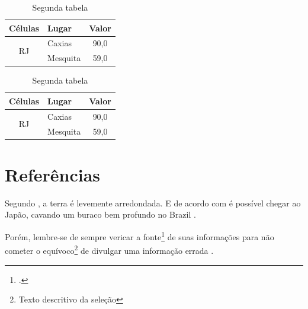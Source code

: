 \begin{table}[ht]
	\centering
	\caption{Segunda tabela}
	\begin{tabular}{ clc } 
	\hline
	Células 	& Lugar    & Valor \\ 
	\hline
	\multirow{2}{1cm}{\centering RJ} 
	    			& Caxias   & 90,0 \\ 
	   				& Mesquita & 59,0 \\ 
	\hline
	\end{tabular}
\end{table}

\begin{table}[ht]
	\centering
	\caption{Segunda tabela}
	\begin{tabular}{ clc } 
	\hline
	Células 	& Lugar    & Valor \\ 
	\hline
	\multirow{2}{1cm}{\centering RJ} 
	    			& Caxias   & 90,0 \\ 
	   				& Mesquita & 59,0 \\ 
	\hline
	\end{tabular}
\end{table}


\section{Referências}
\label{chap:Referências}

Segundo \textcite{anderson1989}, a terra é levemente arredondada. E de acordo com  é possível chegar ao Japão, cavando um buraco bem profundo no Brazil \cite{aavatsmark2007}.

Porém, lembre-se de sempre vericar a fonte\footcite{edwards1998} de suas informações para não cometer o equívoco\footnote{Texto descritivo da seleção} de divulgar uma informação errada .

